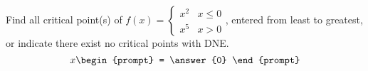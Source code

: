 \documentclass{ximera}
\author{Gregory Hartman \and Matthew Carr}
\begin{document}
\begin{exercise}



Find all critical point(s) of $f(x)= \left\{\begin{array}{cc} x^2 & x\leq 0 \\ x^5 & x> 0 \end{array} \right.$, entered from least to greatest, or indicate there exist no critical points with DNE.
\[
x
\begin{prompt}
= \answer{0}
\end{prompt}
\]


\end{exercise}
\end{document}
